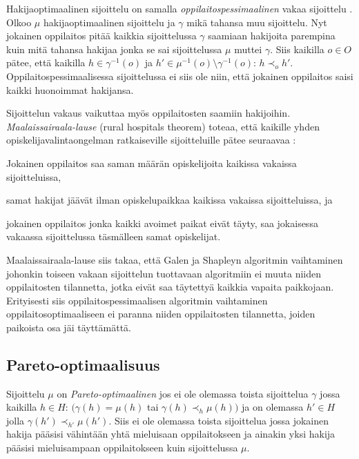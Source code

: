 \documentclass[twoside]{tktltiki}
\begin{document}
Hakijaoptimaalinen sijoittelu on samalla
\emph{oppilaitospessimaalinen} vakaa sijoittelu \cite{gusfield89}.
Olkoo $\mu$ hakijaoptimaalinen sijoittelu ja $\gamma$ mikä tahansa muu
sijoittelu. Nyt jokainen oppilaitos pitää kaikkia sijoittelussa
$\gamma$ saamiaan hakijoita parempina kuin mitä tahansa hakijaa jonka
se sai sijoittelussa $\mu$ muttei $\gamma$. Siis kaikilla $o \in O$
pätee, että kaikilla $h \in \gamma^{-1}(o)$ ja $h' \in \mu^{-1}(o)
\setminus \gamma^{-1}(o)$: $h \prec_o h'$. Oppilaitospessimaalisessa
sijoittelussa ei siis ole niin, että jokainen oppilaitos saisi kaikki
huonoimmat hakijansa.
\newpage

Sijoittelun vakaus vaikuttaa myös oppilaitosten saamiin hakijoihin.
\emph{Maalaissairaala-lause} (rural hospitals theorem) toteaa, että
kaikille yhden opiskelijavalintaongelman ratkaiseville sijoitteluille
pätee seuraavaa \cite{gusfield89}:

\begin{itemize*}
  \item Jokainen oppilaitos saa saman määrän opiskelijoita kaikissa
    vakaissa sijoitteluissa,
  \item samat hakijat jäävät ilman opiskelupaikkaa kaikissa vakaissa
    sijoitteluissa, ja
  \item jokainen oppilaitos jonka kaikki avoimet paikat eivät täyty,
    saa jokaisessa vakaassa sijoittelussa täsmälleen samat
    opiskelijat.
\end{itemize*}

Maalaissairaala-lause siis takaa, että Galen ja Shapleyn algoritmin
vaihtaminen johonkin toiseen vakaan sijoittelun tuottavaan algoritmiin
ei muuta niiden oppilaitosten tilannetta, jotka eivät saa täytettyä
kaikkia vapaita paikkojaan. Erityisesti siis oppilaitospessimaalisen
algoritmin vaihtaminen oppilaitosoptimaaliseen ei paranna niiden
oppilaitosten tilannetta, joiden paikoista osa jäi täyttämättä.

\subsection{Pareto-optimaalisuus}

Sijoittelu $\mu$ on \emph{Pareto-optimaalinen} jos ei ole olemassa
toista sijoittelua $\gamma$ jossa kaikilla $h \in H$: $(\gamma(h) =
\mu(h)$ tai $\gamma(h) \prec_h \mu(h))$ ja on olemassa $h' \in H$
jolla $\gamma(h') \prec_{h'} \mu(h')$. Siis ei ole olemassa toista
sijoittelua jossa jokainen hakija pääsisi vähintään yhtä mieluisaan
oppilaitokseen ja ainakin yksi hakija pääsisi mieluisampaan
oppilaitokseen kuin sijoittelussa $\mu$.
\end{document}

